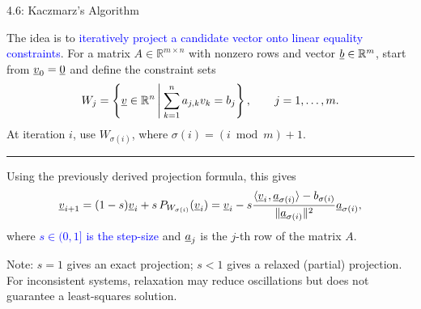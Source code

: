 \documentclass[10pt,english,aspectratio=169]{beamer}
\begin{document}
\begin{frame}{4.6: Kaczmarz's Algorithm}

The idea is to \textcolor{blue}{iteratively project a candidate vector onto linear equality constraints}. For a matrix $A\in\mathbb{R}^{m\times n}$ with nonzero rows and vector $\underline b\in\mathbb{R}^{m}$, start from $\underline{v}_0 = \underline{0}$ and define the constraint sets \vspace{-0.5mm}
\[
W_{j}=\left\{ \underline v\in\mathbb{R}^{n}\,\middle|\:\sum_{k=1}^{n}a_{j,k}v_{k}=b_{j}\right\} ,\qquad j=1,\ldots,m.
\]
At iteration $i$, use $W_{\sigma(i)}$, where $\sigma(i)=(i\bmod m)+1$.
\vspace{3mm}

\hrule

\vspace{3mm}

Using the previously derived projection formula, this gives  \vspace{-0.5mm}
\begin{equation*}
\underline v_{i+1}= (1-s) \underline{v}_i + s \, P_{W_{\sigma(i)}} (\underline{v}_i) = \underline v_{i}- s \frac{{\langle \underline v_{i} \mskip1mu , \underline a_{\sigma(i)} \rangle}-b_{\sigma(i)}}{\text{\ensuremath{\|}}\underline a_{\sigma(i)}\|^{2}}\underline a_{\sigma(i)},
\end{equation*}
where \textcolor{blue}{$s\in(0,1]$ is the step-size} and $\underline a_{j}$ is the $j$-th row of the matrix $A$. 

\vspace{2mm}
Note: $s=1$ gives an exact projection; $s<1$ gives a relaxed (partial) projection. For inconsistent systems, relaxation may reduce oscillations but does not guarantee a least-squares solution.
\end{frame}
\end{document}
